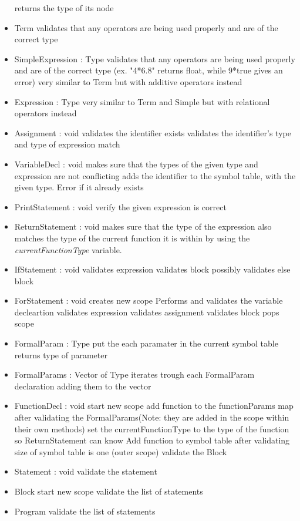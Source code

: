 \begin{itemize}
		\subitem returns the type of its node
	\item Term
		\subitem validates that any operators are being used properly and are of the correct type
	\item SimpleExpression : Type
		\subitem validates that any operators are being used properly and are of the correct type (ex. "4*6.8" returns float, while 9*true gives an error)
		\subitem very similar to Term but with additive operators instead
	\item Expression : Type
		\subitem very similar to Term and Simple but with relational operators instead
	\item Assignment : void
		\subitem validates the identifier exists
		\subitem validates the identifier's type and type of expression match
	\item VariableDecl : void
		\subitem makes sure that the types of the given type and expression are not conflicting
		\subitem adds the identifier to the symbol table, with the given type. Error if it already exists
	\item PrintStatement : void
		\subitem verify the given expression is correct
	\item ReturnStatement : void
		\subitem makes sure that the type of the expression also matches the type of the current function it is within by using the \textit{currentFunctionType} variable.
	\item IfStatement : void
		\subitem validates expression
		\subitem validates block
		\subitem possibly validates else block
	\item ForStatement : void
		\subitem creates new scope
		\subitem Performs and validates the variable decleartion
		\subitem validates expression
		\subitem validates assignment
		\subitem validates block
		\subitem pops scope
	\item FormalParam : Type
		\subitem put the each paramater in the current symbol table
		\subitem returns type of parameter
	\item FormalParams : Vector of Type
		\subitem iterates trough each FormalParam declaration adding them to the vector
	\item FunctionDecl : void
		\subitem start new scope
		\subitem add function to the functionParams map after validating the FormalParams(Note: they are added in the scope within their own methods)
		\subitem set the currentFunctionType to the type of the function so ReturnStatement can know
		Add function to symbol table after validating size of symbol table is one (outer scope)
		\subitem validate the Block
	\item Statement : void
		\subitem validate the statement
	\item Block
		\subitem start new scope
		\subitem validate the list of statements
	\item Program
		\subitem validate the list of statements
\end{itemize}